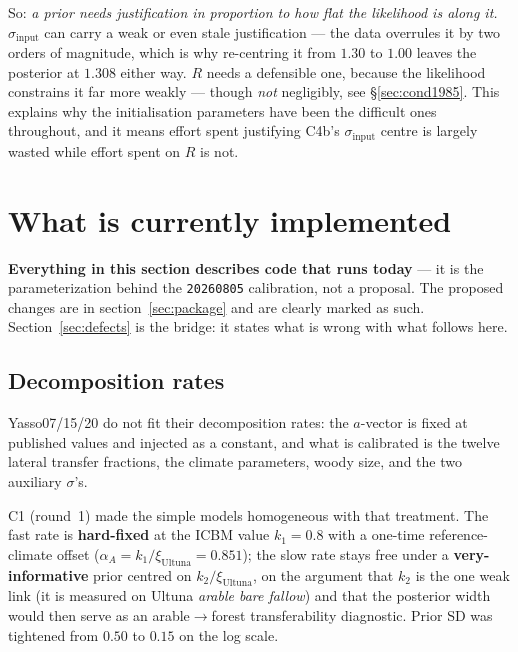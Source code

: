 \documentclass[11pt]{article}
\newcommand{\sinput}{\sigma_{\mathrm{input}}}
\begin{document}
\noindent So: \emph{a prior needs justification in proportion to how flat the likelihood is along
it.} $\sinput$ can carry a weak or even stale justification --- the data overrules it by two
orders of magnitude, which is why re-centring it from $1.30$ to $1.00$ leaves the posterior at
$1.308$ either way. $R$ needs a defensible one, because the likelihood constrains it far more weakly ---
though \emph{not} negligibly, see \S\ref{sec:cond1985}. This explains why the initialisation
parameters have been the difficult ones throughout, and it means effort spent justifying C4b's
$\sinput$ centre is largely wasted while effort spent on $R$ is not.

\section{What is currently implemented}\label{sec:current}

\begin{caveat}
\textbf{Everything in this section describes code that runs today} --- it is the parameterization
behind the \texttt{20260805} calibration, not a proposal. The proposed changes are in
section~\ref{sec:package} and are clearly marked as such. Section~\ref{sec:defects} is the bridge:
it states what is wrong with what follows here.
\end{caveat}

\subsection{Decomposition rates}
Yasso07/15/20 do not fit their decomposition rates: the $a$-vector is fixed at published
values and injected as a constant, and what is calibrated is the twelve lateral transfer
fractions, the climate parameters, woody size, and the two auxiliary $\sigma$'s.

C1 (round~1) made the simple models homogeneous with that treatment. The fast rate is
\textbf{hard-fixed} at the ICBM value $k_1 = 0.8$ with a one-time reference-climate offset
($\alpha_A = k_1/\xi_{\mathrm{Ultuna}} = 0.851$); the slow rate stays free under a
\textbf{very-informative} prior centred on $k_2/\xi_{\mathrm{Ultuna}}$, on the argument that
$k_2$ is the one weak link (it is measured on Ultuna \emph{arable bare fallow}) and that the
posterior width would then serve as an arable$\rightarrow$forest transferability diagnostic.
Prior SD was tightened from $0.50$ to $0.15$ on the log scale.
\end{document}
